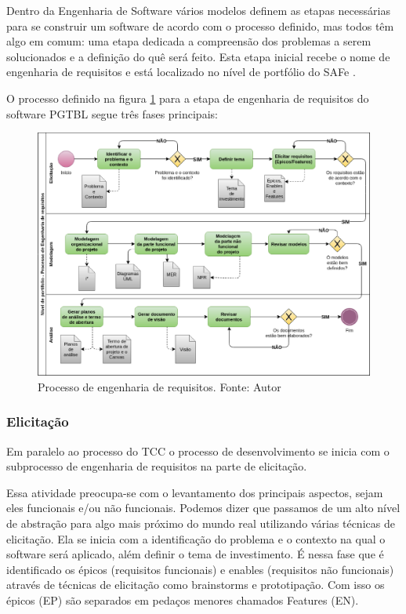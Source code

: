 Dentro da Engenharia de Software vários modelos definem as etapas necessárias para se construir um software de acordo
com o processo definido, mas todos têm algo em comum: uma etapa dedicada a compreensão dos problemas a serem
solucionados e a definição do quê será feito. Esta etapa inicial recebe o nome de engenharia de requisitos e está
localizado no nível de portfólio do SAFe \cite{pressman}.

O processo definido na figura \ref{fig:requisitos} para a etapa de engenharia de requisitos do software PGTBL segue três fases principais:

\begin{figure}[h!]
	\centering
  \includegraphics[keepaspectratio=true,scale=0.5]{figuras/requisitos.eps}
  \caption[Processo de engenharia de requisitos.]{Processo de engenharia de requisitos. Fonte: Autor}
	\label{fig:requisitos}
\end{figure}

\subsubsection{Elicitação}

Em paralelo ao processo do TCC o processo de desenvolvimento se inicia com o subprocesso de engenharia de requisitos na parte de elicitação.

Essa atividade preocupa-se com o levantamento dos principais aspectos, sejam eles funcionais e/ou não funcionais.  Podemos dizer que passamos de um alto nível de abstração para algo mais próximo do mundo real utilizando várias técnicas de elicitação. Ela se inicia com a identificação do problema e o contexto na qual o software será aplicado, além definir o tema de investimento. É nessa fase que é identificado os épicos (requisitos funcionais) e enables (requisitos não funcionais) através de técnicas de elicitação como brainstorms e prototipação. Com isso os épicos (EP) são separados em pedaços menores chamados Features (EN).

